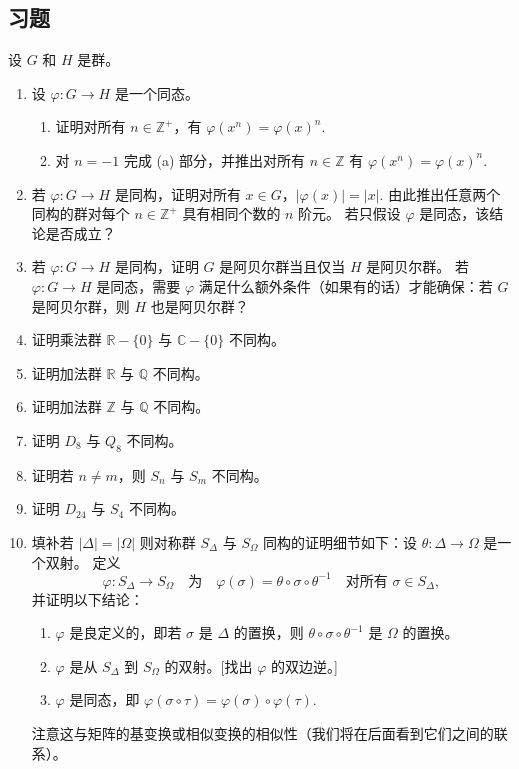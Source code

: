 \subsection*{习题}
设 \( G \text{ 和 } H\) 是群。
\begin{enumerate}
\item 设 \( \varphi : G \to H \) 是一个同态。
\begin{enumerate}[label=(\alph*)]
\item 证明对所有 \( n \in \mathbb{Z}^+ \)，有 \( \varphi(x^n) = \varphi(x)^n \).
\item 对 \( n = -1 \) 完成 (a) 部分，并推出对所有 \( n \in \mathbb{Z} \) 有 \( \varphi(x^n) = \varphi(x)^n \).
\end{enumerate}

\item 若 \( \varphi : G \to H \) 是同构，证明对所有 \( x \in G \)，\( |\varphi(x)| = |x| \). 由此推出任意两个同构的群对每个 \( n \in \mathbb{Z}^+ \) 具有相同个数的 \( n \) 阶元。 若只假设 \( \varphi \) 是同态，该结论是否成立？

\item 若 \( \varphi : G \to H \) 是同构，证明 \( G \) 是阿贝尔群当且仅当 \( H \) 是阿贝尔群。 若 \( \varphi : G \to H \) 是同态，需要 \( \varphi \) 满足什么额外条件（如果有的话）才能确保：若 \( G \) 是阿贝尔群，则 \( H \) 也是阿贝尔群？

\item 证明乘法群 \( \mathbb{R} - \{0\} \) 与 \( \mathbb{C} - \{0\} \) 不同构。

\item 证明加法群 \( \mathbb{R} \) 与 \( \mathbb{Q} \) 不同构。

\item 证明加法群 \( \mathbb{Z} \) 与 \( \mathbb{Q} \) 不同构。

\item 证明 \( D_8 \) 与 \( Q_8 \) 不同构。

\item 证明若 \( n \neq m \)，则 \( S_n \) 与 \( S_m \) 不同构。

\item 证明 \( D_{24} \) 与 \( S_4 \) 不同构。

\item 填补若 \( |\Delta| = |\Omega| \) 则对称群 \( S_\Delta \) 与 \( S_\Omega \) 同构的证明细节如下：设 \( \theta : \Delta \to \Omega \) 是一个双射。 定义
\[
\varphi : S_\Delta \to S_\Omega \quad \text{为} \quad \varphi(\sigma) = \theta \circ \sigma \circ \theta^{-1} \quad \text{对所有 } \sigma \in S_\Delta,
\]
并证明以下结论：
\begin{enumerate}[label=(\alph*)]
\item \( \varphi \) 是良定义的，即若 \( \sigma \) 是 \( \Delta \) 的置换，则 \( \theta \circ \sigma \circ \theta^{-1} \) 是 \( \Omega \) 的置换。
\item \( \varphi \) 是从 \( S_\Delta \) 到 \( S_\Omega \) 的双射。[找出 \( \varphi \) 的双边逆。]
\item \( \varphi \) 是同态，即 \( \varphi(\sigma \circ \tau) = \varphi(\sigma) \circ \varphi(\tau) \).
\end{enumerate}
注意这与矩阵的基变换或相似变换的相似性（我们将在后面看到它们之间的联系）。


\end{enumerate}
